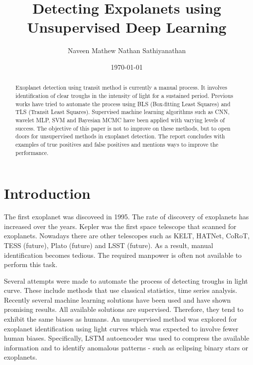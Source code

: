 \documentclass[%
aip,
amsmath,amssymb,
reprint,%
]{revtex4-1}
\begin{document}
\title{Detecting Expolanets using Unsupervised Deep Learning}

\author{Naveen Mathew Nathan Sathiyanathan}

\date{\today}

\begin{abstract}
Exoplanet detection using transit method is currently a manual process. It involves identification of clear troughs in the intensity of light for a sustained period. Previous works have tried to automate the process using BLS (Box-fitting Least Squares) and TLS (Transit Least Squares). Supervised machine learning algorithms such as CNN, wavelet MLP, SVM and Bayesian MCMC have been applied with varying levels of success. The objective of this paper is not to improve on these methods, but to open doors for unsupervised methods in exoplanet detection. The report concludes with examples of true positives and false positives and mentions ways to improve the performance.
\end{abstract}

\maketitle

\section{Introduction}

The first exoplanet was discoveed in 1995. The rate of discovery of exoplanets has increased over the years. Kepler was the first space telescope that scanned for exoplanets. Nowadays there are other telescopes such as KELT, HATNet, CoRoT, TESS (future), Plato (future) and LSST (future). As a result, manual identification becomes tedious. The required manpower is often not available to perform this task.

Several attempts were made to automate the process of detecting troughs in light curve. These include methods that use classical statistics, time series analysis. Recently several machine learning solutions have been used and have shown promising results. All available solutions are supervised. Therefore, they tend to exhibit the same biases as humans. An unsupervised method was explored for exoplanet identification using light curves which was expected to involve fewer human biases. Specifically, LSTM autoencoder was used to compress the available information and to identify anomalous patterns - such as eclipsing binary stars or exoplanets.
\end{document}
